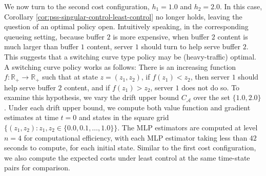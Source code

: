 \documentclass[11pt]{article}
\theoremstyle{definition}
\theoremstyle{plain}
\newcommand{\R}{\mathbb{R}}
\begin{document}
We now turn to the second cost configuration, $h_1 = 1.0$ and $h_2 = 2.0$. In this case, 
Corollary \ref{cor:pss-singular-control-least-control} no longer holds, 
leaving the question of an optimal policy open. 
Intuitively speaking, in the corresponding queueing setting, 
because buffer $2$ is more expensive, when buffer $2$ content is much larger than buffer $1$ content, 
server $1$ should turn to help serve buffer $2$. This suggests that a switching curve type policy may be (heavy-traffic) optimal. 
A switching curve policy works as follows: There is an increasing function $f: \R_+ \to \R_+$ 
such that at state $z = (z_1, z_2)$, if $f(z_1) < z_2$, then server $1$ should help serve buffer $2$ content, 
and if $f(z_1) > z_2$, server $1$ does not do so.  
To examine this hypothesis, we vary the drift upper bound $C_{\mathcal{A}}$ over the set $\{1.0, 2.0\}$. 
Under each drift upper bound, we compute both value function and gradient estimates at time $t=0$ and 
states in the square grid $\{(z_1,z_2): z_1,z_2 \in \{0.0, 0.1, \dots, 1.0\}\}$. 
The MLP estimators are computed at level $n=4$ for computational efficiency, 
with each MLP estimator taking less than $42$ seconds to compute, for each initial state. 
Similar to the first cost configuration, we also compute the expected costs under least control at the same time-state pairs for comparison. 
\end{document}
